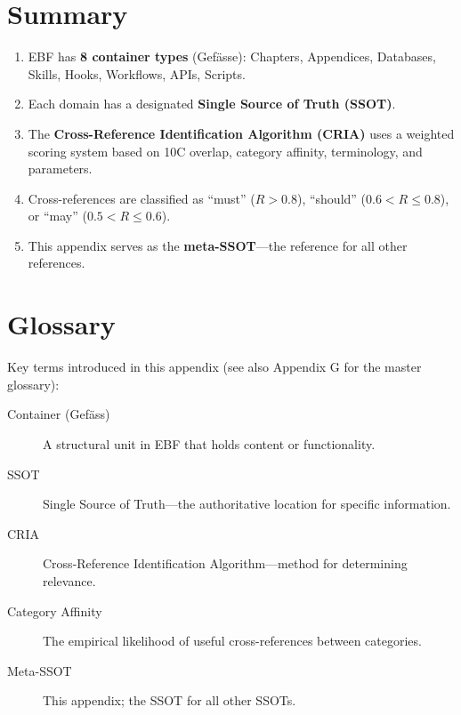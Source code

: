 \section{Summary}
\label{sec:bo-summary}

\begin{tcolorbox}[colback=blue!5!white, colframe=blue!75!black,
    title=Key Takeaways]

\begin{enumerate}
\item EBF has \textbf{8 container types} (Gefässe): Chapters, Appendices, Databases,
      Skills, Hooks, Workflows, APIs, Scripts.

\item Each domain has a designated \textbf{Single Source of Truth (SSOT)}.

\item The \textbf{Cross-Reference Identification Algorithm (CRIA)} uses a weighted
      scoring system based on 10C overlap, category affinity, terminology, and parameters.

\item Cross-references are classified as ``must'' ($R > 0.8$), ``should'' ($0.6 < R \leq 0.8$),
      or ``may'' ($0.5 < R \leq 0.6$).

\item This appendix serves as the \textbf{meta-SSOT}---the reference for all other references.
\end{enumerate}

\end{tcolorbox}



\section{Glossary}
\label{sec:bo-glossary}

Key terms introduced in this appendix (see also Appendix G for the master glossary):

\begin{description}
\item[Container (Gefäss)] A structural unit in EBF that holds content or functionality.
\item[SSOT] Single Source of Truth---the authoritative location for specific information.
\item[CRIA] Cross-Reference Identification Algorithm---method for determining relevance.
\item[Category Affinity] The empirical likelihood of useful cross-references between categories.
\item[Meta-SSOT] This appendix; the SSOT for all other SSOTs.
\end{description}


